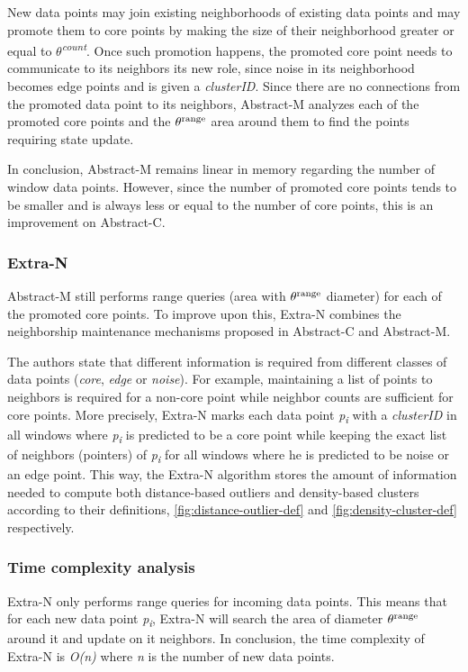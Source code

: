 New data points may join existing neighborhoods of existing data points and may promote them to core points by making the size of their neighborhood greater or equal to \textit{$\theta$\textsuperscript{count}}. Once such promotion happens, the promoted core point needs to communicate to its neighbors its new role, since noise in its neighborhood becomes edge points and is given a \textit{clusterID}. Since there are no connections from the promoted data point to its neighbors, Abstract-M analyzes each of the promoted core points and the $\theta\textsuperscript{range}$ area around them to find the points requiring state update. 

In conclusion, Abstract-M remains linear in memory regarding the number of window data points. However, since the number of promoted core points tends to be smaller and is always less or equal to the number of core points, this is an improvement on Abstract-C.

\subsubsection{Extra-N}

Abstract-M still performs range queries (area with $\theta\textsuperscript{range}$ diameter) for each of the promoted core points. To improve upon this, Extra-N combines the neighborship maintenance mechanisms proposed in Abstract-C and Abstract-M.

The authors state that different information is required from different classes of data points (\textit{core}, \textit{edge} or \textit{noise}). For example, maintaining a list of points to neighbors is required for a non-core point while neighbor counts are sufficient for core points. More precisely, Extra-N marks each data point \textit{p\textsubscript{i}} with a \textit{clusterID} in all windows where \textit{p\textsubscript{i}} is predicted to be a core point while keeping the exact list of neighbors (pointers) of \textit{p\textsubscript{i}} for all windows where he is predicted to be noise or an edge point. This way, the Extra-N algorithm stores the amount of information needed to compute both distance-based outliers and density-based clusters according to their definitions, \ref{fig:distance-outlier-def} and \ref{fig:density-cluster-def} respectively.

\subsubsection*{Time complexity analysis}
Extra-N only performs range queries for incoming data points. This means that for each new data point \textit{p\textsubscript{i}}, Extra-N will search the area of diameter $\theta\textsuperscript{range}$ around it and update on it neighbors. In conclusion, the time complexity of Extra-N is \textit{O(n)} where \textit{n} is the number of new data points. 

